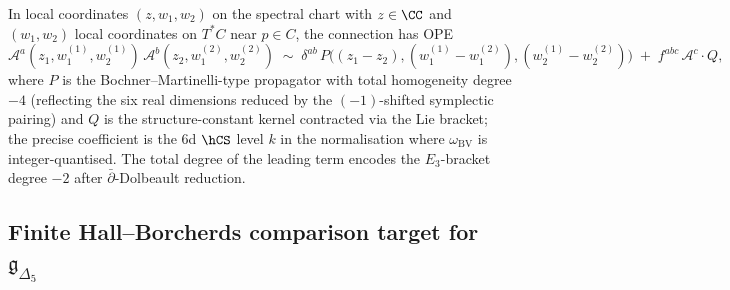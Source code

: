 \begin{remark}
In local coordinates $(z,w_1,w_2)$ on the spectral chart with $z\in\CC$
and $(w_1,w_2)$ local coordinates on $T^*C$ near $p\in C$, the
connection has OPE
\[
\mathcal{A}^a(z_1,w_1^{(1)},w_2^{(1)})\,\mathcal{A}^b(z_2,w_1^{(2)},w_2^{(2)})
\;\sim\;
\delta^{ab}\,P\bigl((z_1-z_2),(w_1^{(1)}-w_1^{(2)}),(w_2^{(1)}-w_2^{(2)})\bigr)
\;+\;
f^{abc}\,\mathcal{A}^c\cdot Q,
\]
where $P$ is the Bochner--Martinelli-type propagator with total
homogeneity degree $-4$ (reflecting the six real dimensions reduced
by the $(-1)$-shifted symplectic pairing) and $Q$ is the
structure-constant kernel contracted via the Lie bracket; the precise
coefficient is the 6d $\hCS$ level $k$ in the normalisation where
$\omega_{\mathrm{BV}}$ is integer-quantised. The total degree of the
leading term encodes the $E_3$-bracket degree $-2$ after
$\bar\partial$-Dolbeault reduction.
\end{remark}

\subsection{Finite Hall--Borcherds comparison target for $\mathfrak{g}_{\Delta_5}$}
\label{subsec:E3-Delta5}


